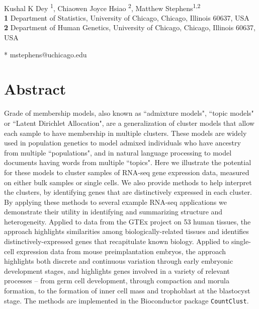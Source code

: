 \documentclass[10pt,letterpaper]{article}
\begin{document}
\vspace*{0.2in}

\begin{flushleft}
{\Large
\textbf{}
}
\newline
\\
Kushal K Dey \textsuperscript{1},
Chiaowen Joyce Hsiao \textsuperscript{2},
Matthew Stephens\textsuperscript{1,2}
\\
\bigskip
\textbf{1} Department of Statistics, University of Chicago, Chicago, Illinois 60637, USA
\\
\textbf{2} Department of Human Genetics, University of Chicago, Chicago, Illinois 60637, USA
\\
\bigskip

* mstephens@uchicago.edu

\end{flushleft}


\section*{Abstract}
Grade of membership models, also known as ``admixture models", ``topic models" or ``Latent Dirichlet Allocation",
are a generalization of cluster models that allow each sample to have membership in multiple clusters.
These models are widely used in population genetics to model admixed individuals who have ancestry from multiple ``populations",
and in natural language processing to model documents having words from multiple ``topics". Here we illustrate the potential for these models
to cluster samples of RNA-seq gene expression data, measured on either bulk samples or single cells.
We also provide methods to help interpret the clusters, by identifying genes that are distinctively expressed in each cluster.
By applying these methods to several example RNA-seq applications we demonstrate their utility in
identifying and summarizing structure and heterogeneity. Applied to
data from the GTEx project on 53 human tissues, the approach highlights similarities among biologically-related tissues and
identifies distinctively-expressed genes that recapitulate known biology.  Applied to single-cell expression data from
mouse preimplantation embryos, the approach highlights both discrete and continuous variation through early embryonic development stages,
and highlights genes involved in a variety of relevant processes -- from germ cell development, through compaction and morula formation, to
the formation of inner cell mass and trophoblast at the blastocyst stage.
The methods are implemented in the Bioconductor package {\tt CountClust}.
\end{document}
